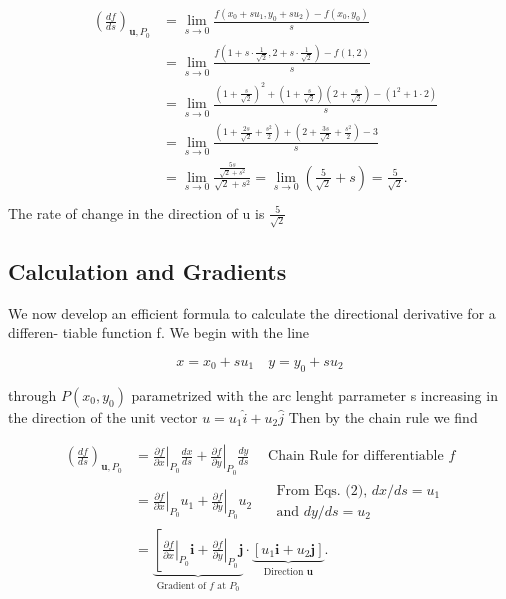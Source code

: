 \documentclass[12pt,a4paper,draft]{article}
\begin{document}
\begin{solution}
    \[\begin{aligned}
        &\begin{aligned}
        \left(\frac{d f}{d s}\right)_{\mathbf{u}, P_0} & =\lim _{s \rightarrow 0} \frac{f\left(x_0+s u_1, y_0+s u_2\right)-f\left(x_0, y_0\right)}{s} \\
        & =\lim _{s \rightarrow 0} \frac{f\left(1+s \cdot \frac{1}{\sqrt{2}}, 2+s \cdot \frac{1}{\sqrt{2}}\right)-f(1,2)}{s} \\
        & =\lim _{s \rightarrow 0} \frac{\left(1+\frac{s}{\sqrt{2}}\right)^2+\left(1+\frac{s}{\sqrt{2}}\right)\left(2+\frac{s}{\sqrt{2}}\right)-\left(1^2+1 \cdot 2\right)}{s} \\
        & =\lim _{s \rightarrow 0} \frac{\left(1+\frac{2 s}{\sqrt{2}}+\frac{s^2}{2}\right)+\left(2+\frac{3 s}{\sqrt{2}}+\frac{s^2}{2}\right)-3}{s} \\
        & =\lim _{s \rightarrow 0} \frac{\frac{5s}{\sqrt{2} + s^2}}{\sqrt{2}+s^2}=\lim _{s \rightarrow 0}\left(\frac{5}{\sqrt{2}}+s\right)=\frac{5}{\sqrt{2}} .
        \end{aligned}\\
        \end{aligned}
        \]
    The rate of change in the direction of u is \(\frac{5}{\sqrt{2}}\)
\end{solution}

\subsection{Calculation and Gradients}

We now develop an efficient formula to calculate the directional derivative for a differen-
tiable function ƒ. We begin with the line

\[x = x_0 + su_1 \quad y = y_0 + su_2\]

through \(P(x_0,y_0)\) parametrized with the arc lenght parrameter s increasing in the direction of the unit vector \(u = u_1 \hat{i} + u_2 \hat{j}\) Then by the chain rule we find

\[\begin{aligned}
    \left(\frac{d f}{d s}\right)_{\mathbf{u}, P_0} & =\left.\frac{\partial f}{\partial x}\right|_{P_0} \frac{d x}{d s}+\left.\frac{\partial f}{\partial y}\right|_{P_0} \frac{d y}{d s} \quad \text { Chain Rule for differentiable } f \\
    & =\left.\frac{\partial f}{\partial x}\right|_{P_0} u_1+\left.\frac{\partial f}{\partial y}\right|_{P_0} u_2 \quad \begin{array}{l}
    \text { From Eqs. (2), } d x / d s=u_1 \\
    \text { and } d y / d s=u_2
    \end{array} \\
    & =\underbrace{\left[\left.\frac{\partial f}{\partial x}\right|_{P_0} \mathbf{i}+\left.\frac{\partial f}{\partial y}\right|_{P_0} \mathbf{j}\right.}_{\text {Gradient of } f \text { at } P_0} \cdot \underbrace{\left[u_1 \mathbf{i}+u_2 \mathbf{j}\right]}_{\text {Direction } \mathbf{u}} .
    \end{aligned}\]
\end{document}
